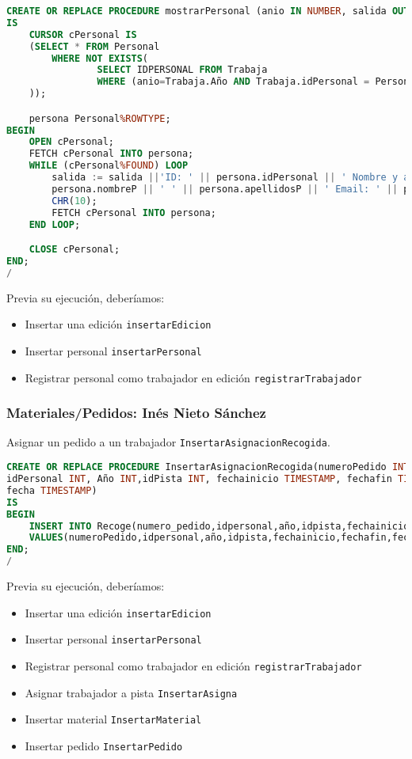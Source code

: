 \begin{lstlisting}[language=sql]
CREATE OR REPLACE PROCEDURE mostrarPersonal (anio IN NUMBER, salida OUT CLOB)
IS
	CURSOR cPersonal IS
	(SELECT * FROM Personal
		WHERE NOT EXISTS(
				SELECT IDPERSONAL FROM Trabaja
				WHERE (anio=Trabaja.Año AND Trabaja.idPersonal = Personal.idPersonal)
	));

	persona Personal%ROWTYPE;
BEGIN
	OPEN cPersonal;
	FETCH cPersonal INTO persona;
	WHILE (cPersonal%FOUND) LOOP
		salida := salida ||'ID: ' || persona.idPersonal || ' Nombre y apellidos: ' ||
		persona.nombreP || ' ' || persona.apellidosP || ' Email: ' || persona.emailp ||
		CHR(10);
		FETCH cPersonal INTO persona;
	END LOOP;

	CLOSE cPersonal;
END;
/
\end{lstlisting}

\pagebreak

Previa su ejecución, deberíamos:
\begin{itemize}
	\item Insertar una edición \texttt{insertarEdicion}
	\item Insertar personal \texttt{insertarPersonal}
	\item Registrar personal como trabajador en edición \texttt{registrarTrabajador}
\end{itemize}

\subsubsection{Materiales/Pedidos: Inés Nieto Sánchez}
Asignar un pedido a un trabajador \texttt{InsertarAsignacionRecogida}.

\begin{lstlisting}[language=sql]
CREATE OR REPLACE PROCEDURE InsertarAsignacionRecogida(numeroPedido INT,
idPersonal INT, Año INT,idPista INT, fechainicio TIMESTAMP, fechafin TIMESTAMP,
fecha TIMESTAMP)
IS
BEGIN
	INSERT INTO Recoge(numero_pedido,idpersonal,año,idpista,fechainicio,fechafin,fecha)
	VALUES(numeroPedido,idpersonal,año,idpista,fechainicio,fechafin,fecha);
END;
/
\end{lstlisting}

Previa su ejecución, deberíamos:
\begin{itemize}
	\item Insertar una edición \texttt{insertarEdicion}
	\item Insertar personal \texttt{insertarPersonal}
	\item Registrar personal como trabajador en edición \texttt{registrarTrabajador}
	\item Asignar trabajador a pista \texttt{InsertarAsigna}
	\item Insertar material \texttt{InsertarMaterial}
	\item Insertar pedido \texttt{InsertarPedido}
\end{itemize}

